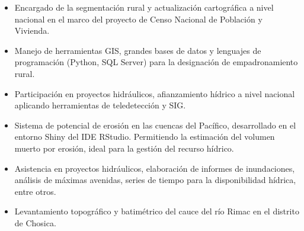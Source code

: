 \documentclass[10pt,a4paper,normalphoto]{altacv}
\begin{document}
\begin{itemize}
\item Encargado de la segmentación rural y actualización cartográﬁca a nivel nacional en el marco del proyecto de Censo Nacional de Población y Vivienda. 
\item Manejo de herramientas GIS, grandes bases de datos y lenguajes de programación (Python, SQL Server) para la designación de empadronamiento rural.
\end{itemize}
\divider

\begin{itemize}
\item Participación en proyectos hidráulicos, aﬁanzamiento hídrico a nivel nacional aplicando herramientas de teledetección y SIG. 
\item Sistema de potencial de erosión en las cuencas del Pacíﬁco, desarrollado en el entorno Shiny del IDE RStudio. Permitiendo la estimación del volumen muerto por erosión, ideal para la gestión del recurso hídrico.
\end{itemize}
\divider


\begin{itemize}
\item Asistencia en proyectos hidráulicos, elaboración de informes de inundaciones, análisis de máximas avenidas, series de tiempo para la disponibilidad hídrica, entre otros.
\item Levantamiento topográﬁco y batimétrico del cauce del río Rimac en el distrito de Chosica.
\end{itemize}
\divider


\end{document}
